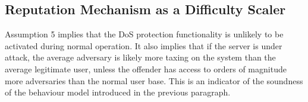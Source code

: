 


\subsection{Reputation Mechanism as a Difficulty Scaler}\label{text:diffscaler}
Assumption 5 implies that the DoS protection functionality is unlikely to be activated during normal operation. It also implies that if the server is under attack, the average adversary is likely more taxing on the system than the average legitimate user, unless the offender has access to orders of magnitude more adversaries than the normal user base. This is an indicator of the soundness of the behaviour model introduced in the previous paragraph. 

